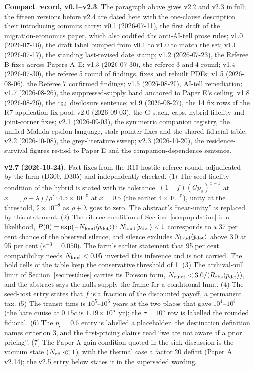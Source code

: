 \documentclass[11pt]{article}
\begin{document}
\textbf{Compact record, v0.1--v2.3.} The paragraph above gives v2.2 and v2.3 in full; the fifteen versions before v2.4 are dated here with the one-clause description their introducing commits carry: v0.1 (2026-07-11), the first draft of the migration-economics paper, which also codified the anti-AI-tell prose rules; v1.0 (2026-07-16), the draft label bumped from v0.1 to v1.0 to match the set; v1.1 (2026-07-17), the standing last-revised date stamp; v1.2 (2026-07-23), the Referee B fixes across Papers A--E; v1.3 (2026-07-30), the referee 3 and 4 round; v1.4 (2026-07-30), the referee 5 round of findings, fixes and rebuilt PDFs; v1.5 (2026-08-06), the Referee 7 confirmed findings; v1.6 (2026-08-20), AI-tell remediation; v1.7 (2026-08-26), the suppressed-supply band anchored to Paper E's ceiling; v1.8 (2026-08-26), the $\tau_{\rm fid}$ disclosure sentence; v1.9 (2026-08-27), the 14 fix rows of the R7 application fix pool; v2.0 (2026-09-03), the G-stack, caps, hybrid-fidelity and joint-corner fixes; v2.1 (2026-09-03), the symmetric companion registry, the unified Mahida-epsilon language, stale-pointer fixes and the shared fiducial table; v2.2 (2026-10-08), the grey-literature sweep; v2.3 (2026-10-20), the residence-survival figures re-tied to Paper E and the companion-dependence sentence.

\textbf{v2.7 (2026-10-24).} Fact fixes from the R10 hostile-referee round, adjudicated by the farm (D300, D305) and independently checked. (1) The seed-fidelity condition of the hybrid is stated with its tolerance, $(1-f)(G p_{s})^{x-1}$ at $x = (\rho+\lambda)/\rho^{*}$: $4.5\times10^{-5}$ at $x = 0.5$ (the earlier $4\times10^{-5}$), unity at the threshold, $2\times10^{-9}$ as $\rho+\lambda$ goes to zero. The abstract's ``near-unity'' is replaced by this statement. (2) The silence condition of Section~\ref{sec:population} is a likelihood, $P(0)=\exp(-N_{\rm loud}\langle p_{\rm det}\rangle)$: $N_{\rm loud}\langle p_{\rm det}\rangle<1$ corresponds to a 37 per cent chance of the observed silence, and silence excludes $N_{\rm loud}\langle p_{\rm det}\rangle$ above $3.0$ at 95 per cent ($e^{-3}=0.050$). The farm's earlier statement that 95 per cent compatibility needs $N_{\rm loud}<0.05$ inverted this inference and is not carried. The bold cells of the table keep the conservative threshold of 1. (3) The archival-null limit of Section~\ref{sec:residues} carries its Poisson form, $N_{\rm quiet}<3.0/(R_{\rm obs}\langle p_{\rm det}\rangle)$, and the abstract says the nulls supply the frame for a conditional limit. (4) The seed-cost entry states that $f$ is a fraction of the discounted payoff, a permanent tax. (5) The transit time is $10^{5}$--$10^{6}$ years at the two places that gave $10^{4}$--$10^{6}$ (the bare cruise at $0.15c$ is $1.19\times10^{5}$~yr); the $\tau = 10^{5}$ row is labelled the rounded fiducial. (6) The $p_s = 0.5$ entry is labelled a placeholder, the destination definition names criterion 3, and the first-pricing claims read ``we are not aware of a prior pricing''. (7) The Paper A gain condition quoted in the sink discussion is the vacuum state ($N_{\rm eff}\ll1$), with the thermal case a factor 20 deficit (Paper A v2.14); the v2.5 entry below states it in the superseded wording.
\end{document}
